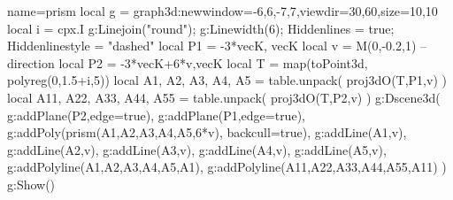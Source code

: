 \documentclass[12pt]{standalone}%
\begin{document}
\begin{luadraw}{name=prism}
local g = graph3d:new{window={-6,6,-7,7},viewdir={30,60},size={10,10}}
local i = cpx.I
g:Linejoin("round"); g:Linewidth(6); Hiddenlines = true; Hiddenlinestyle = "dashed"
local P1 = {-3*vecK, vecK}
local v = M(0,-0.2,1) -- direction
local P2 = {-3*vecK+6*v,vecK}
local T = map(toPoint3d, polyreg(0,1.5+i,5))
local A1, A2, A3, A4, A5 = table.unpack( proj3dO(T,P1,v) )
local A11, A22, A33, A44, A55 = table.unpack( proj3dO(T,P2,v) )
g:Dscene3d(
    g:addPlane(P2,{edge=true}), g:addPlane(P1,{edge=true}),
    g:addPoly(prism({A1,A2,A3,A4,A5},6*v), {backcull=true}),
    g:addLine({A1,v}), g:addLine({A2,v}), g:addLine({A3,v}), g:addLine({A4,v}), g:addLine({A5,v}),
    g:addPolyline({A1,A2,A3,A4,A5,A1}), g:addPolyline({A11,A22,A33,A44,A55,A11})
)
g:Show()
\end{luadraw}
\end{document}
